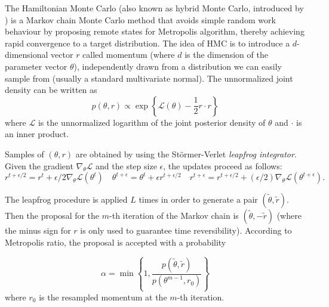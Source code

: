 \documentclass{article}
\begin{document}
The Hamiltonian Monte Carlo (also known as hybrid Monte Carlo, introduced by \citealp{duane1987hybrid}) is a Markov chain Monte Carlo method that avoids simple random work behaviour by proposing remote states for Metropolis algorithm, thereby achieving rapid convergence to a target distribution.
The idea of HMC is to introduce a $d$-dimensional vector $r$ called momentum (where $d$ is the dimension of the parameter vector $\theta$), independently drawn from a distribution we can easily sample from (usually a standard multivariate normal). The unnormalized joint density can be written as
$$ p(\theta,r) \propto \exp\left\{\mathcal{L}(\theta)-\frac{1}{2} r \cdot r\right\} $$
where $\mathcal{L}$ is the unnormalized logarithm of the joint posterior density of $\theta$ and $\cdot$ is an inner product.

\par Samples of $(\theta,r)$ are obtained by using the St{\"o}rmer-Verlet \textit{leapfrog integrator}. Given the gradient $\nabla_{\theta}\mathcal{L}$ and the step size $\epsilon$, the updates proceed as follows:
\begin{equation*}
r^{t+\epsilon/2}=r^t+\epsilon/2 \nabla_{\theta}\mathcal{L}(\theta^t)
\quad \theta^{t+\epsilon} = \theta^t+\epsilon r^{t+\epsilon/2} \quad
r^{t+\epsilon}=r^{t+\epsilon/2}+(\epsilon/2)\nabla_{\theta}\mathcal{L}(\theta^{t+\epsilon}).
\end{equation*}

\par The leapfrog procedure is applied $L$ times in order to generate a pair $(\tilde{\theta},\tilde{r})$. Then the proposal for the $m$-th iteration of the Markov chain is $(\tilde{\theta},-\tilde{r})$ (where the minus sign for $r$ is only used to guarantee time reversibility). According to Metropolis ratio, the proposal is accepted %
with a probability

\begin{equation*}
\alpha=\min\left\{1,\frac{p(\tilde{\theta},\tilde{r})}{p(\theta^{m-1},r_0)}\right\}
\end{equation*}
\noindent where $r_0$ is the resampled momentum at the $m$-th iteration.
\end{document}
